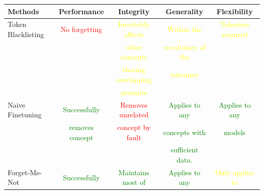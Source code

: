 \begin{table}[h]
    \centering
    \label{my-label}
    \begin{tabular}{|l|c|c|c|c|}
    \hline
    \textbf{Methods}      & \textbf{Performance}                     & \textbf{Integrity}                            & \textbf{Generality}                        & \textbf{Flexibility}                 \\ \hline
    Token Blacklisting    & \textcolor{red}{No forgetting}           & \textcolor{yellow}{Inevitably affects}                            & \textcolor{yellow}{Within the}                                 & \textcolor{yellow}{Tokenizer required}                    \\
                          &                                          & \textcolor{yellow}{other concepts}                              & \textcolor{yellow}{vocabulary of the}                        &                                       \\
                          &                                          & \textcolor{yellow}{sharing overlapping}                        & \textcolor{yellow}{tokenizer}                                 &                                       \\
                          &                                          & \textcolor{yellow}{prompts}                                      &                                           &                                       \\ \hline
    Naive Finetuning      & \textcolor{green}{Successfully}          & \textcolor{red}{Removes unrelated}           & \textcolor{green}{Applies to any}          & \textcolor{green}{Applies to any}     \\
                          & \textcolor{green}{removes concept}       & \textcolor{red}{concept by fault}            & \textcolor{green}{concepts with}           & \textcolor{green}{models}             \\
                          &                                          &                                               & \textcolor{green}{sufficient data.}        &                                       \\ \hline
    Forget-Me-Not         & \textcolor{green}{Successfully}          & \textcolor{green}{Maintains most of}                             & \textcolor{green}{Applies to any}                             & \textcolor{yellow}{Only applies to}                       \\

\end{tabular}
\end{table}
